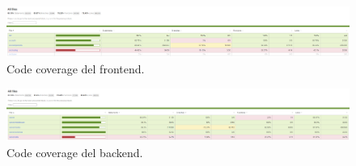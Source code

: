 \documentclass[a4paper, 11pt]{article}
\begin{document}
\begin{figure}[H]
    \centering
    \includegraphics[width=\textwidth]{test_client}
    \caption{Code coverage del frontend.}
\end{figure}

\begin{figure}[H]
    \centering
    \includegraphics[width=\textwidth]{test-server}
    \caption{Code coverage del backend.}
\end{figure}
\end{document}
